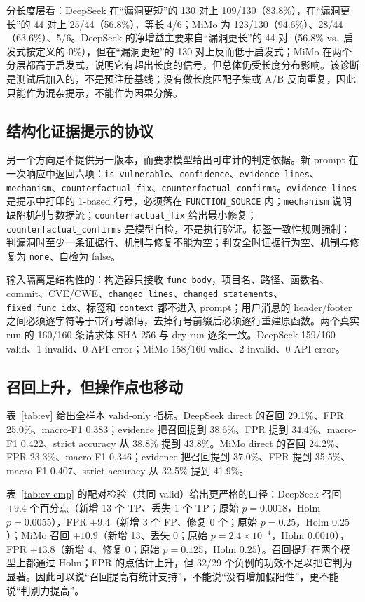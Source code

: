 \documentclass[conference]{IEEEtran}
\begin{document}
分长度层看：DeepSeek 在“漏洞更短”的 130 对上 109/130（83.8\%），在“漏洞更长”的 44 对上 25/44（56.8\%），等长 4/6；MiMo 为 123/130（94.6\%）、28/44（63.6\%）、5/6。DeepSeek 的净增益主要来自“漏洞更长”的 44 对（56.8\% vs.\ 启发式按定义的 0\%），但在“漏洞更短”的 130 对上反而低于启发式；MiMo 在两个分层都高于启发式，说明它有超出长度的信号，但总体仍受长度分布影响。该诊断是测试后加入的，不是预注册基线；没有做长度匹配子集或 A/B 反向重复，因此只能作为混杂提示，不能作为因果分解。

\subsection{结构化证据提示的协议}
另一个方向是不提供另一版本，而要求模型给出可审计的判定依据。新 prompt 在一次响应中返回六项：\texttt{is\_vulnerable}、\texttt{confidence}、\texttt{evidence\_lines}、\texttt{mechanism}、\texttt{counterfactual\_fix}、\texttt{counterfactual\_confirms}。\texttt{evidence\_lines} 是提示中打印的 1-based 行号，必须落在 \texttt{FUNCTION\_SOURCE} 内；\texttt{mechanism} 说明缺陷机制与数据流；\texttt{counterfactual\_fix} 给出最小修复；\texttt{counterfactual\_confirms} 是模型自检，不是执行验证。标签一致性规则强制：判漏洞时至少一条证据行、机制与修复不能为空；判安全时证据行为空、机制与修复为 \texttt{none}、自检为 false。

输入隔离是结构性的：构造器只接收 \texttt{func\_body}，项目名、路径、函数名、commit、CVE/CWE、\texttt{changed\_lines}、\texttt{changed\_statements}、\texttt{fixed\_func\_idx}、标签和 \texttt{context} 都不进入 prompt；用户消息的 header/footer 之间必须逐字符等于带行号源码，去掉行号前缀后必须逐行重建原函数。两个真实 run 的 160/160 条请求体 SHA-256 与 dry-run 逐条一致。DeepSeek 159/160 valid、1 invalid、0 API error；MiMo 158/160 valid、2 invalid、0 API error。

\subsection{召回上升，但操作点也移动}
表~\ref{tab:ev} 给出全样本 valid-only 指标。DeepSeek direct 的召回 29.1\%、FPR 25.0\%、macro-F1 0.383；evidence 把召回提到 38.6\%、FPR 提到 34.4\%、macro-F1 0.422、strict accuracy 从 38.8\% 提到 43.8\%。MiMo direct 的召回 24.2\%、FPR 23.3\%、macro-F1 0.346；evidence 把召回提到 37.0\%、FPR 提到 35.5\%、macro-F1 0.407、strict accuracy 从 32.5\% 提到 41.9\%。

表~\ref{tab:ev-cmp} 的配对检验（共同 valid）给出更严格的口径：DeepSeek 召回 $+9.4$ 个百分点（新增 13 个 TP、丢失 1 个 TP；原始 $p=0.0018$，Holm $p=0.0055$），FPR $+9.4$（新增 3 个 FP、修复 0 个；原始 $p=0.25$，Holm $0.25$）；MiMo 召回 $+10.9$（新增 13、丢失 0；原始 $p=2.4\times10^{-4}$，Holm $0.0010$），FPR $+13.8$（新增 4、修复 0；原始 $p=0.125$，Holm $0.25$）。召回提升在两个模型上都通过 Holm；FPR 的点估计上升，但 32/29 个负例的功效不足以把它判为显著。因此可以说“召回提高有统计支持”，不能说“没有增加假阳性”，更不能说“判别力提高”。
\end{document}

